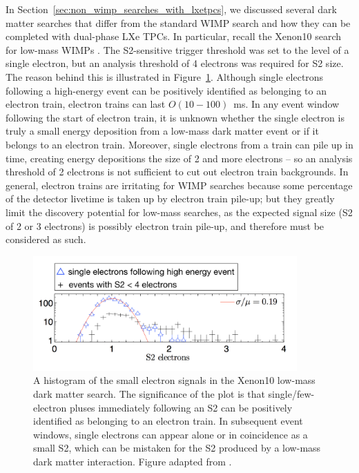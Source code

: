 In Section~\ref{sec:non_wimp_searches_with_lxetpcs}, we discussed several dark matter searches that differ from the standard \ac{WIMP} search and how they can be completed with dual-phase \ac{LXe} \ac{TPC}s. In particular, recall the Xenon10 search for low-mass \ac{WIMP}s \cite{Angle2011}. The S2-sensitive trigger threshold was set to the level of a single electron, but an analysis threshold of 4 electrons was required for S2 size. The reason behind this is illustrated in Figure~\ref{fig:xenon10_s2s}. Although single electrons following a high-energy event can be positively identified as belonging to an electron train, electron trains can last $O(10-100)$~ms. In any event window following the start of electron train, it is unknown whether the single electron is truly a small energy deposition from a low-mass dark matter event or if it belongs to an electron train. Moreover, single electrons from a train can pile up in time, creating energy depositions the size of 2 and more electrons -- so an analysis threshold of 2 electrons is not sufficient to cut out electron train backgrounds. In general, electron trains are irritating for \ac{WIMP} searches because some percentage of the detector livetime is taken up by electron train pile-up; but they greatly limit the discovery potential for low-mass searches, as the expected signal size (S2 of 2 or 3 electrons) is possibly electron train pile-up, and therefore must be considered as such.

\begin{figure}[htbp]
\begin{center}
\includegraphics[width=0.9\textwidth]{figures/etrains/xenon10_s2s.png}
\caption{A histogram of the small electron signals in the Xenon10 low-mass dark matter search. The significance of the plot is that single/few-electron pluses immediately following an S2 can be positively identified as belonging to an electron train. In subsequent event windows, single electrons can appear alone or in coincidence as a small S2, which can be mistaken for the S2 produced by a low-mass dark matter interaction. Figure adapted from \cite{Angle2011}.}
\label{fig:xenon10_s2s}
\end{center}
\end{figure}

